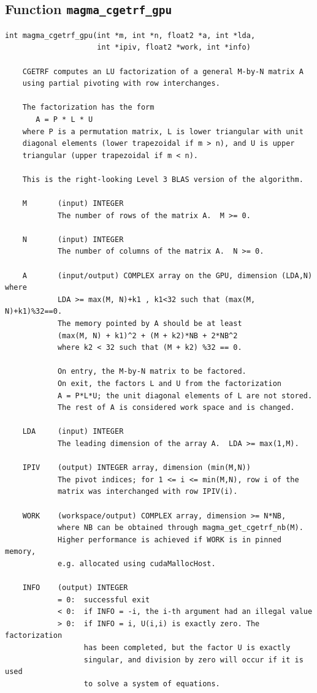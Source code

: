 \documentclass[10pt]{book}
\begin{document}
\newpage
\subsection{Function {\tt {\bf magma\_cgetrf\_gpu}}}
\begin{verbatim}
int magma_cgetrf_gpu(int *m, int *n, float2 *a, int *lda, 
                     int *ipiv, float2 *work, int *info)
   
    CGETRF computes an LU factorization of a general M-by-N matrix A   
    using partial pivoting with row interchanges.   

    The factorization has the form   
       A = P * L * U   
    where P is a permutation matrix, L is lower triangular with unit   
    diagonal elements (lower trapezoidal if m > n), and U is upper   
    triangular (upper trapezoidal if m < n).   

    This is the right-looking Level 3 BLAS version of the algorithm.   

    M       (input) INTEGER   
            The number of rows of the matrix A.  M >= 0.   

    N       (input) INTEGER   
            The number of columns of the matrix A.  N >= 0.   

    A       (input/output) COMPLEX array on the GPU, dimension (LDA,N) where
            LDA >= max(M, N)+k1 , k1<32 such that (max(M, N)+k1)%32==0.
            The memory pointed by A should be at least 
            (max(M, N) + k1)^2 + (M + k2)*NB + 2*NB^2
            where k2 < 32 such that (M + k2) %32 == 0.
                 
            On entry, the M-by-N matrix to be factored.   
            On exit, the factors L and U from the factorization   
            A = P*L*U; the unit diagonal elements of L are not stored.   
            The rest of A is considered work space and is changed.

    LDA     (input) INTEGER   
            The leading dimension of the array A.  LDA >= max(1,M).   

    IPIV    (output) INTEGER array, dimension (min(M,N))   
            The pivot indices; for 1 <= i <= min(M,N), row i of the   
            matrix was interchanged with row IPIV(i).   

    WORK    (workspace/output) COMPLEX array, dimension >= N*NB,
            where NB can be obtained through magma_get_cgetrf_nb(M).
            Higher performance is achieved if WORK is in pinned memory, 
            e.g. allocated using cudaMallocHost.

    INFO    (output) INTEGER   
            = 0:  successful exit   
            < 0:  if INFO = -i, the i-th argument had an illegal value   
            > 0:  if INFO = i, U(i,i) is exactly zero. The factorization   
                  has been completed, but the factor U is exactly   
                  singular, and division by zero will occur if it is used   
                  to solve a system of equations.   
\end{verbatim}
\end{document}
